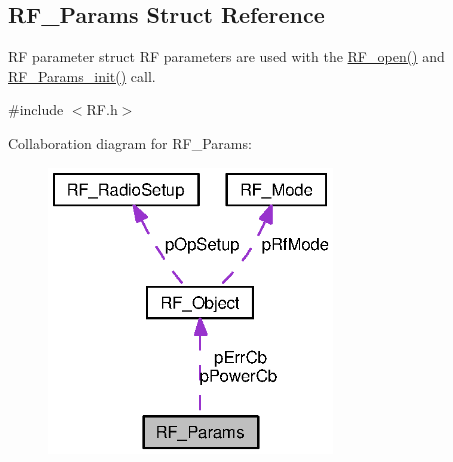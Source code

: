 \subsection{R\+F\+\_\+\+Params Struct Reference}
\label{struct_r_f___params}


R\+F parameter struct R\+F parameters are used with the \hyperlink{_r_f_8h_a13a7c6f5a2b797e0aac18fecfaba6f64}{R\+F\+\_\+open()} and \hyperlink{_r_f_8h_ab956de3745437cb7a69c4edfb006434e}{R\+F\+\_\+\+Params\+\_\+init()} call.  




{\ttfamily \#include $<$R\+F.\+h$>$}



Collaboration diagram for R\+F\+\_\+\+Params\+:
\nopagebreak
\begin{figure}[H]
\begin{center}
\leavevmode
\includegraphics[width=214pt]{struct_r_f___params__coll__graph}
\end{center}
\end{figure}
